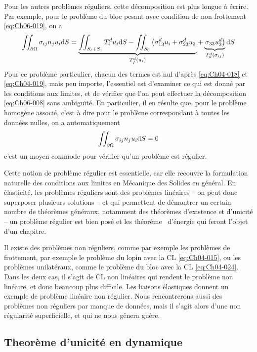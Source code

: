 Pour les autres problèmes réguliers, cette décomposition est plus longue à écrire.
Par exemple, pour le problème du bloc pesant avec condition de non frottement \eqref{eq:Ch06-019}, on a
\begin{equation}
    \iint_{\partial \Omega} \sigma_{ij} n_j u_i \mathrm{d} S = \underbrace{\iint_{S_l +S_1} T_i^d u_i \mathrm{d} S - \iint_{S_0} \left( \sigma_{13}^d u_i + \sigma_{23}^d u_2 \right.}_{T_f^d\left( u_i \right)} + \underbrace{ \left.\sigma_{33} u_3^d \right)}_{T_u^d\left(\sigma_{ij} \right)} \mathrm{d} S
    \label{eq:Ch06-010}
\end{equation}
Pour ce problème particulier, chacun des termes est nul d'après \eqref{eq:Ch04-018} et \eqref{eq:Ch04-019}, mais peu importe, l'essentiel est d'examiner ce qui est donné par les conditions aux limites, et de vérifier que l'on peut effectuer la décomposition \eqref{eq:Ch06-008} sans ambiguïté.
En particulier, il en résulte que, pour le problème homogène associé, c'est à dire pour le problème correspondant à toutes les données nulles, on a automatiquement
\begin{equation}
    \iint_{\partial \Omega} \sigma_{ij} n_j u_i \mathrm{d} S = 0
    \label{eq:Ch06-011}
\end{equation}
c'est un moyen commode pour vérifier qu'un problème est régulier.

Cette notion de problème régulier est essentielle, car elle recouvre la formulation naturelle des conditions aux limites en Mécanique des Solides en général.
En élasticité, les problèmes réguliers sont des problèmes linéaires -- on peut donc superposer plusieurs solutions -- et qui permettent de démontrer un certain nombre de théorèmes généraux, notamment des théorèmes d'existence et d'unicité -- un problème régulier est bien posé et les théorème~ d'énergie qui feront l'objet d'un chapitre.

Il existe des problèmes non réguliers, comme par exemple les problèmes de frottement, par exemple le problème du lopin avec la CL \eqref{eq:Ch04-015}, ou les problèmes unilatéraux, comme le problème du bloc avec la CL \eqref{eq:Ch04-024}.
Dans les deux cas, il s'agit de CL non linéaires qui rendent le problème non linéaire, et donc beaucoup plus difficile.
Les liaisons élastiques donnent un exemple de problème linéaire non régulier.
Nous rencontrerons aussi des problèmes non réguliers par manque de données, mais il s'agit alors d'une non régularité superficielle, et qui ne nous gênera guère.

\subsection{Theorème d'unicité en dynamique}
\endinput
Comme nous l'avons affirmé plus haut, un problème régulier est bien 
posé, càd admet une solution unique. A titre d'exemple, nous allons démontrer 
le théorème d'unicité dans le cas dynamique. Nous partons donc d'un problème dynamique régulier. Pour fixer les notations, nous prendrons des CL mixtes de 
-84 ­
type (7), mais la démonstration est valable, à des difficultés de notations près, pour tout problème régulier. Nous cherchons donc A. ''J.-1), (J.. (x. 1),
..... l } -\.-â J 
suivant 
cs· . := 
A...~.t\\. e~v..
(12) .L~

